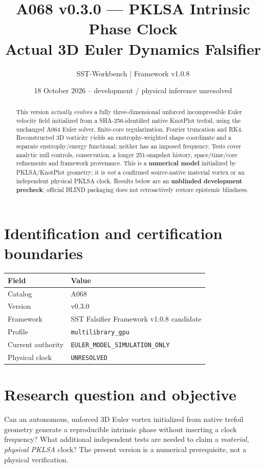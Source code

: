 \documentclass[11pt,a4paper]{article}
\title{A068 v0.3.0 --- PKLSA Intrinsic Phase Clock\\Actual 3D Euler Dynamics Falsifier}
\author{SST-Workbench | Framework v1.0.8}
\date{18 October 2026 -- development / physical inference unresolved}
\begin{document}
\maketitle
\begin{abstract}
This version \emph{actually evolves} a fully three-dimensional unforced incompressible Euler velocity field initialized from a SHA-256-identified native KnotPlot trefoil, using the unchanged A064 Euler solver, finite-core regularization, Fourier truncation and RK4. Reconstructed 3D vorticity yields an enstrophy-weighted shape coordinate and a separate enstrophy/energy functional; neither has an imposed frequency. Tests cover analytic null controls, conservation, a longer 251-snapshot history, space/time/core refinements and framework provenance. This is a \textbf{numerical model} initialized by PKLSA/KnotPlot geometry; it is \emph{not} a confirmed source-native material vortex or an independent physical PKLSA clock. Results below are an \textbf{unblinded development precheck}; official BLIND packaging does not retroactively restore epistemic blindness.
\end{abstract}

\section{Identification and certification boundaries}
\begin{tabular}{ll}
\toprule Field & Value\\\midrule
Catalog & A068\\ Version & v0.3.0\\ Framework & SST Falsifier Framework v1.0.8 candidate\\
Profile & \texttt{multilibrary\_gpu}\\ Current authority & \texttt{EULER\_MODEL\_SIMULATION\_ONLY}\\
Physical clock & \texttt{UNRESOLVED}\\ \bottomrule
\end{tabular}

\section{Research question and objective}
Can an autonomous, unforced 3D Euler vortex initialized from native trefoil geometry generate a reproducible intrinsic phase without inserting a clock frequency? What additional independent tests are needed to claim a \emph{material, physical PKLSA} clock? The present version is a numerical prerequisite, not a physical verification.
\end{document}
